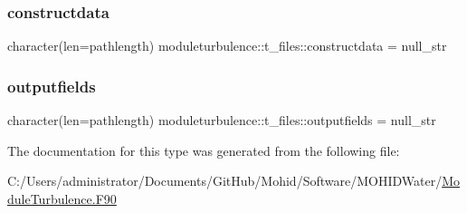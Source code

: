 \subsubsection{\texorpdfstring{constructdata}{constructdata}}
{\footnotesize\ttfamily character(len=pathlength) moduleturbulence\+::t\+\_\+files\+::constructdata = null\+\_\+str\hspace{0.3cm}{\ttfamily [private]}}

\mbox{\label{structmoduleturbulence_1_1t__files_ad5179e718245343a06e63322c7c1edd6}} 
\subsubsection{\texorpdfstring{outputfields}{outputfields}}
{\footnotesize\ttfamily character(len=pathlength) moduleturbulence\+::t\+\_\+files\+::outputfields = null\+\_\+str\hspace{0.3cm}{\ttfamily [private]}}



The documentation for this type was generated from the following file\+:\begin{DoxyCompactItemize}
\item 
C\+:/\+Users/administrator/\+Documents/\+Git\+Hub/\+Mohid/\+Software/\+M\+O\+H\+I\+D\+Water/\mbox{\hyperlink{_module_turbulence_8_f90}{Module\+Turbulence.\+F90}}\end{DoxyCompactItemize}
